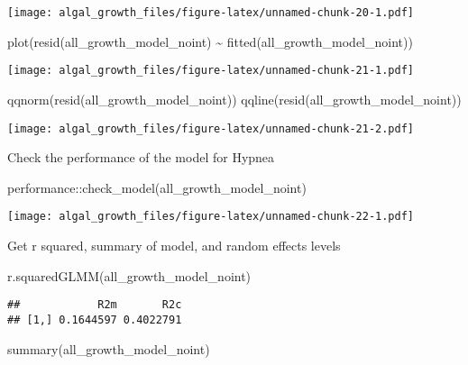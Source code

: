 \documentclass[
]{article}
\newenvironment{Shaded}{\begin{snugshade}}{\end{snugshade}}
\newcommand{\FunctionTok}[1]{\textcolor[rgb]{0.00,0.00,0.00}{#1}}
\newcommand{\NormalTok}[1]{#1}
\newcommand{\SpecialCharTok}[1]{\textcolor[rgb]{0.00,0.00,0.00}{#1}}
\begin{document}
\texttt{[image: algal\_growth\_files/figure-latex/unnamed-chunk-20-1.pdf]}

\begin{Shaded}
\begin{Highlighting}[]
\FunctionTok{plot}\NormalTok{(}\FunctionTok{resid}\NormalTok{(all\_growth\_model\_noint) }\SpecialCharTok{\textasciitilde{}} \FunctionTok{fitted}\NormalTok{(all\_growth\_model\_noint))}
\end{Highlighting}
\end{Shaded}

\texttt{[image: algal\_growth\_files/figure-latex/unnamed-chunk-21-1.pdf]}

\begin{Shaded}
\begin{Highlighting}[]
\FunctionTok{qqnorm}\NormalTok{(}\FunctionTok{resid}\NormalTok{(all\_growth\_model\_noint))}
\FunctionTok{qqline}\NormalTok{(}\FunctionTok{resid}\NormalTok{(all\_growth\_model\_noint))}
\end{Highlighting}
\end{Shaded}

\texttt{[image: algal\_growth\_files/figure-latex/unnamed-chunk-21-2.pdf]}

Check the performance of the model for Hypnea

\begin{Shaded}
\begin{Highlighting}[]
\NormalTok{performance}\SpecialCharTok{::}\FunctionTok{check\_model}\NormalTok{(all\_growth\_model\_noint)}
\end{Highlighting}
\end{Shaded}

\texttt{[image: algal\_growth\_files/figure-latex/unnamed-chunk-22-1.pdf]}

Get r squared, summary of model, and random effects levels

\begin{Shaded}
\begin{Highlighting}[]
\FunctionTok{r.squaredGLMM}\NormalTok{(all\_growth\_model\_noint)}
\end{Highlighting}
\end{Shaded}

\begin{verbatim}
##            R2m       R2c
## [1,] 0.1644597 0.4022791
\end{verbatim}

\begin{Shaded}
\begin{Highlighting}[]
\FunctionTok{summary}\NormalTok{(all\_growth\_model\_noint)}
\end{Highlighting}
\end{Shaded}
\end{document}
